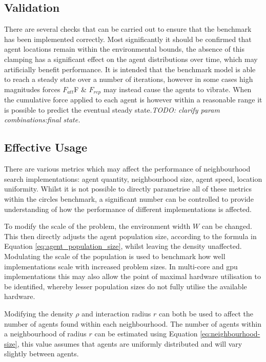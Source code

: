       
  \subsection{Validation}
    There are several checks that can be carried out to ensure that the benchmark has been implemented correctly. Most significantly it should be confirmed that agent locations remain within the environmental bounds, the absence of this clamping has a significant effect on the agent distributions over time, which may artificially benefit performance. It is intended that the benchmark model is able to reach a steady state over a number of iterations, however in some cases high magnitudes forces $F_{att}$F \& $F_{rep}$ may instead cause the agents to vibrate. When the cumulative force applied to each agent is however within a reasonable range it is possible to predict the eventual steady state.\textit{TODO: clarify param combinations:final state.}
  
  \subsection{Effective Usage\label{sec:effective-usage}}
    There are various metrics which may affect the performance of neighbourhood search implementations: agent quantity, neighbourhood size, agent speed, location uniformity. Whilst it is not possible to directly parametrise all of these metrics within the circles benchmark, a significant number can be controlled to provide understanding of how the performance of different implementations is affected.
    
    To modify the scale of the problem, the environment width $W$ can be changed. This then directly adjusts the agent population size, according to the formula in Equation \ref{eq:agent_population_size}, whilst leaving the density unaffected. Modulating the scale of the population is used to benchmark how well implementations scale with increased problem sizes. In multi-core and \gls{gpu} implementations this may also allow the point of maximal hardware utilisation to be identified, whereby lesser population sizes do not fully utilise the available hardware.
    
    Modifying the density $\rho$ and interaction radius $r$ can both be used to affect the number of agents found within each neighbourhood. The number of agents within a neighbourhood of radius $r$ can be estimated using Equation \ref{eq:neighbourhood-size}, this value assumes that agents are uniformly distributed and will vary slightly between agents.
    
